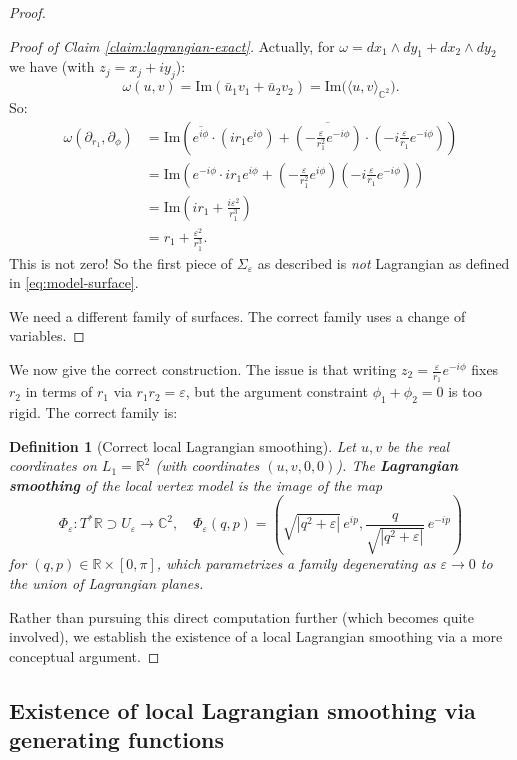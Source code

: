 \documentclass[12pt]{article}
\newtheorem{definition}[theorem]{Definition}
\newcommand{\bR}{\mathbb{R}}
\newcommand{\bC}{\mathbb{C}}
\newcommand{\eps}{\varepsilon}
\newcommand{\om}{\omega}
\begin{document}
\begin{proof}
\begin{proof}[Proof of Claim \ref{claim:lagrangian-exact}]
Actually, for $\om = dx_1\wedge dy_1 + dx_2\wedge dy_2$ we have (with $z_j = x_j + iy_j$):
\[
  \om(u,v) = \mathrm{Im}(\bar u_1 v_1 + \bar u_2 v_2) = \mathrm{Im}\bigl(\langle u, v\rangle_{\bC^2}\bigr).
\]
So:
\begin{align*}
  \om(\partial_{r_1}, \partial_\phi) &= \mathrm{Im}\!\left(\overline{e^{i\phi}} \cdot (ir_1 e^{i\phi}) + \overline{\left(-\tfrac{\eps}{r_1^2}e^{-i\phi}\right)} \cdot \left(-i\tfrac{\eps}{r_1}e^{-i\phi}\right)\right) \\
  &= \mathrm{Im}\!\left(e^{-i\phi} \cdot ir_1 e^{i\phi} + \left(-\tfrac{\eps}{r_1^2}e^{i\phi}\right)\left(-i\tfrac{\eps}{r_1}e^{-i\phi}\right)\right) \\
  &= \mathrm{Im}\!\left(ir_1 + \tfrac{i\eps^2}{r_1^3}\right) \\
  &= r_1 + \tfrac{\eps^2}{r_1^3}.
\end{align*}
This is not zero! So the first piece of $\Sigma_\eps$ as described is \emph{not} Lagrangian as defined in \eqref{eq:model-surface}.

We need a different family of surfaces. The correct family uses a change of variables.
\end{proof}

We now give the correct construction. The issue is that writing $z_2 = \frac{\eps}{r_1}e^{-i\phi}$ fixes $r_2$ in terms of $r_1$ via $r_1 r_2 = \eps$, but the argument constraint $\phi_1 + \phi_2 = 0$ is too rigid. The correct family is:

\begin{definition}[Correct local Lagrangian smoothing]
\label{def:correct-smoothing}
Let $u, v$ be the real coordinates on $L_1 = \bR^2$ (with coordinates $(u,v,0,0)$). The \textbf{Lagrangian smoothing} of the local vertex model is the image of the map
\[
  \Phi_\eps \colon T^*\bR \supset U_\eps \to \bC^2, \quad \Phi_\eps(q, p) = \left(\sqrt{|q^2 + \eps|}\,e^{ip}, \frac{q}{\sqrt{|q^2+\eps|}}\,e^{-ip}\right)
\]
for $(q,p) \in \bR \times [0, \pi]$, which parametrizes a family degenerating as $\eps\to 0$ to the union of Lagrangian planes.
\end{definition}

Rather than pursuing this direct computation further (which becomes quite involved), we establish the existence of a local Lagrangian smoothing via a more conceptual argument.
\end{proof}

\subsection{Existence of local Lagrangian smoothing via generating functions}
\end{document}
